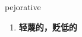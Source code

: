 
\begin{frame}
{\huge pejorative}
\begin{center}
\begin{enumerate}\Large
  \item \textbf{轻蔑的，贬低的}
\end{enumerate}
\end{center}
\end{frame}
